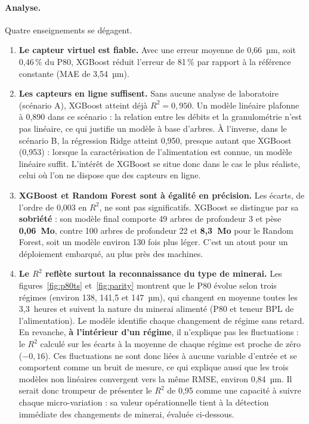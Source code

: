 \paragraph{Analyse.} Quatre enseignements se dégagent.
\begin{enumerate}
  \item \textbf{Le capteur virtuel est fiable.} Avec une erreur moyenne de 0,66~µm, soit 0,46\,\% du P80, XGBoost réduit l'erreur de 81\,\% par rapport à la référence constante (MAE de 3,54~µm).
  \item \textbf{Les capteurs en ligne suffisent.} Sans aucune analyse de laboratoire (scénario A), XGBoost atteint déjà $R^2 = 0{,}950$. Un modèle linéaire plafonne à 0,890 dans ce scénario : la relation entre les débits et la granulométrie n'est pas linéaire, ce qui justifie un modèle à base d'arbres. À l'inverse, dans le scénario B, la régression Ridge atteint 0,950, presque autant que XGBoost (0,953) : lorsque la caractérisation de l'alimentation est connue, un modèle linéaire suffit. L'intérêt de XGBoost se situe donc dans le cas le plus réaliste, celui où l'on ne dispose que des capteurs en ligne.
  \item \textbf{XGBoost et Random Forest sont à égalité en précision.} Les écarts, de l'ordre de 0,003 en $R^2$, ne sont pas significatifs. XGBoost se distingue par sa \textbf{sobriété} : son modèle final comporte 49 arbres de profondeur 3 et pèse \textbf{0,06~Mo}, contre 100 arbres de profondeur 22 et \textbf{8,3~Mo} pour le Random Forest, soit un modèle environ 130 fois plus léger. C'est un atout pour un déploiement embarqué, au plus près des machines.
  \item \textbf{Le $R^2$ reflète surtout la reconnaissance du type de minerai.} Les figures~\ref{fig:p80ts} et~\ref{fig:parity} montrent que le P80 évolue selon trois régimes (environ 138, 141,5 et 147~µm), qui changent en moyenne toutes les 3,3~heures et suivent la nature du minerai alimenté (P80 et teneur BPL de l'alimentation). Le modèle identifie chaque changement de régime sans retard. En revanche, \textbf{à l'intérieur d'un régime}, il n'explique pas les fluctuations : le $R^2$ calculé sur les écarts à la moyenne de chaque régime est proche de zéro ($-0{,}16$). Ces fluctuations ne sont donc liées à aucune variable d'entrée et se comportent comme un bruit de mesure, ce qui explique aussi que les trois modèles non linéaires convergent vers la même RMSE, environ 0,84~µm. Il serait donc trompeur de présenter le $R^2$ de 0,95 comme une capacité à suivre chaque micro-variation : sa valeur opérationnelle tient à la détection immédiate des changements de minerai, évaluée ci-dessous.
\end{enumerate}

